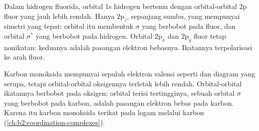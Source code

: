 Dalam hidrogen fluorida, orbital 1s hidrogen bertemu dengan orbital-orbital
2p fluor yang jauh lebih rendah. Hanya $2\mathrm p_z$, sepanjang sumbu, yang
mempunyai simetri yang tepat: orbital itu membentuk  $\sigma$
yang berbobot pada fluor, dan orbital $\sigma^*$ yang berbobot pada
hidrogen. Orbital $2\mathrm p_x$ dan $2\mathrm p_y$ fluor tetap nonikatan:
keduanya adalah pasangan elektron bebasnya. Ikatannya terpolarisasi ke
arah fluor.

Karbon monoksida mempunyai sepuluh elektron valensi seperti  dan
diagram yang serupa, tetapi orbital-orbital oksigennya terletak lebih
rendah. Orbital-orbital ikatannya berbobot pada oksigen; orbital terisi
tertingginya, sebuah orbital $\sigma$ yang berbobot pada karbon, adalah
pasangan elektron bebas pada karbon. Karena itu karbon monoksida terikat
pada logam melalui karbon (\cref{ch:b2:coordination-complexes}).


